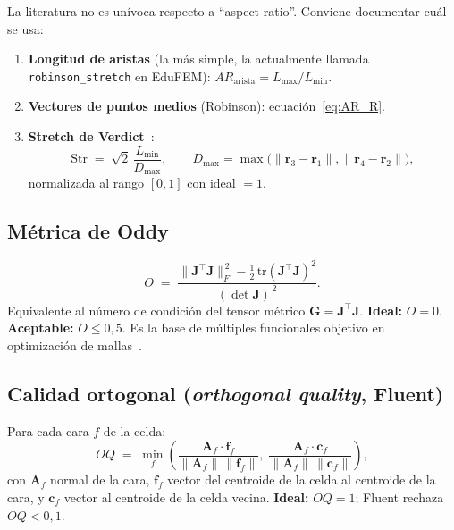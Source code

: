 \documentclass[11pt,a4paper]{article}
\begin{document}
La literatura no es un\'ivoca respecto a ``aspect ratio''. Conviene documentar cu\'al se usa:
\begin{enumerate}[leftmargin=1.4em]
  \item \textbf{Longitud de aristas} (la m\'as simple, la actualmente llamada \texttt{robinson\_stretch} en EduFEM): $AR_{\text{arista}} = L_{\max}/L_{\min}$.
  \item \textbf{Vectores de puntos medios} (Robinson): ecuaci\'on~\eqref{eq:AR_R}.
  \item \textbf{Stretch de Verdict}~\cite{Verdict2007}:
  \begin{equation}
  \mathrm{Str} \;=\; \sqrt{2}\,\frac{L_{\min}}{D_{\max}}, \qquad D_{\max} = \max\bigl(\|\mathbf{r}_3-\mathbf{r}_1\|,\|\mathbf{r}_4-\mathbf{r}_2\|\bigr),
  \label{eq:verdict_stretch}
  \end{equation}
  normalizada al rango $[0,1]$ con ideal $=1$.
\end{enumerate}

\subsection{M\'etrica de Oddy}
\begin{equation}
O \;=\; \frac{\|\mathbf{J}^{\!\top}\mathbf{J}\|_F^{\,2} - \tfrac{1}{2}\,\mathrm{tr}(\mathbf{J}^{\!\top}\mathbf{J})^2}{(\det\mathbf{J})^{\,2}}.
\label{eq:oddy}
\end{equation}
Equivalente al n\'umero de condici\'on del tensor m\'etrico $\mathbf{G}=\mathbf{J}^{\!\top}\mathbf{J}$. \textbf{Ideal:} $O=0$. \textbf{Aceptable:} $O\le 0{,}5$. Es la base de m\'ultiples funcionales objetivo en optimizaci\'on de mallas~\cite{Knupp2000}.

\subsection{Calidad ortogonal (\emph{orthogonal quality}, Fluent)}
Para cada cara $f$ de la celda:
\begin{equation}
OQ \;=\; \min_{f}\!\left(\frac{\mathbf{A}_f\cdot\mathbf{f}_f}{\|\mathbf{A}_f\|\,\|\mathbf{f}_f\|},\;\frac{\mathbf{A}_f\cdot\mathbf{c}_f}{\|\mathbf{A}_f\|\,\|\mathbf{c}_f\|}\right),
\label{eq:OQ}
\end{equation}
con $\mathbf{A}_f$ normal de la cara, $\mathbf{f}_f$ vector del centroide de la celda al centroide de la cara, y $\mathbf{c}_f$ vector al centroide de la celda vecina. \textbf{Ideal:} $OQ=1$; Fluent rechaza $OQ<0{,}1$.
\end{document}
